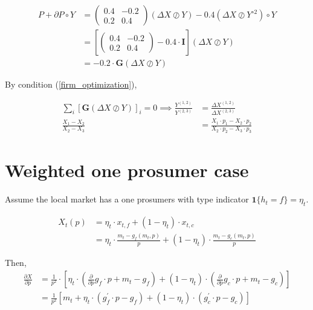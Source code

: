 \documentclass[american]{scrartcl}
\newcommand{\matr}[1]{\bm{#1}}
\begin{document}
\begin{equation}
	\begin{split}
		P + \partial P \circ Y &= \begin{pmatrix}
			0.4 & -0.2 \\
			0.2 & 0.4
		\end{pmatrix} (\Delta X \oslash Y) - 0.4 (\Delta X \oslash Y^{\circ 2}) \circ Y \\
		&=  \left[ \begin{pmatrix}
				0.4 & -0.2 \\
				0.2 & 0.4
			\end{pmatrix}- 0.4 \cdot \matr{I} \right] (\Delta X \oslash Y) \\
		&= - 0.2 \cdot  \matr{G} (\Delta X \oslash Y)
	\end{split}
\end{equation}

By condition (\ref{firm_optimization}),

\begin{equation}
	\begin{split}
		\sum_{i} [\matr{G} (\Delta X \oslash Y)]_i = 0 \implies
		\frac{Y^{(1, 2)}}{Y^{(2, 3)}} &= \frac{\Delta X^{(1, 2)}}{\Delta X^{(2, 3)}} \\
		\frac{X_1 - X_2}{X_2 - X_3} &= \frac{X_1 \cdot p_1 - X_2 \cdot p_2}{X_2 \cdot p_2 - X_3 \cdot p_3}
	\end{split}
\end{equation}

\iffalse %

	\section{Weighted one prosumer case}

	Assume the local market has a one prosumers with type indicator $\mathbf{1}\{h_t = f\} = \eta_t$.

	\begin{equation}
		\begin{split}
			X_t(p) &= \eta_t \cdot x_{t, f} + (1 - \eta_t) \cdot x_{t, c} \\
			&= \eta_t \cdot \frac{m_t - g_f(m_t, p)}{p} + (1 - \eta_t) \cdot \frac{m_t - g_c(m_t, p)}{p}
		\end{split}
	\end{equation}


	Then,
	\begin{equation}
		\begin{split}
			\frac{\partial X}{\partial p} &= \frac{1}{p^2} \cdot \left[ \eta_t \cdot \left(\frac{\partial}{\partial p} g_f \cdot p + m_t - g_f \right) + (1 - \eta_t) \cdot \left(\frac{\partial}{\partial p} g_c \cdot p + m_t - g_c \right) \right] \\
			&=\frac{1}{p^2} \left[m_t + \eta_t \cdot \left( g^\prime_f \cdot p - g_f \right) + (1 - \eta_t) \cdot \left( g^\prime_c \cdot p - g_c \right) \right]
		\end{split}
	\end{equation}
\end{document}
